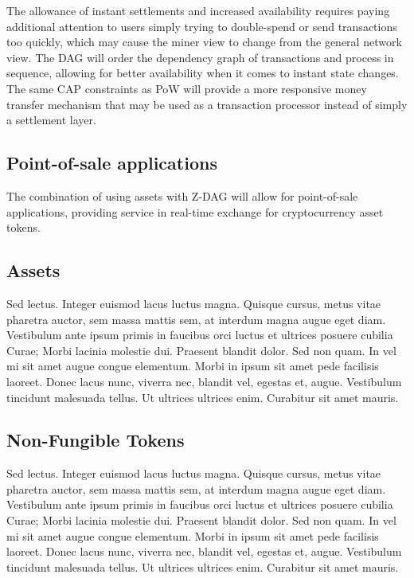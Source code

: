 \documentclass[peerreview]{ieeesyscoin}
\begin{document}
The allowance of instant settlements and increased availability requires paying additional attention to users simply trying to double-spend or send transactions too quickly, which may cause the miner view to change from the general network view. The DAG will order the dependency graph of transactions and process in sequence, allowing for better availability when it comes to instant state changes. The same CAP constraints as PoW will provide a more responsive money transfer mechanism that may be used as a transaction processor instead of simply a settlement layer.

\subsection{Point-of-sale applications}
The combination of using assets with Z-DAG will allow for point-of-sale applications, providing service in real-time exchange for cryptocurrency asset tokens.

\subsection{Assets}
Sed lectus. Integer euismod lacus luctus magna. Quisque cursus, metus vitae pharetra auctor, sem massa mattis sem, at interdum magna augue eget diam. Vestibulum ante ipsum primis in faucibus orci luctus et ultrices posuere cubilia Curae; Morbi lacinia molestie dui. Praesent blandit dolor. Sed non quam. In vel mi sit amet augue congue elementum. Morbi in ipsum sit amet pede facilisis laoreet. Donec lacus nunc, viverra nec, blandit vel, egestas et, augue. Vestibulum tincidunt malesuada tellus. Ut ultrices ultrices enim. Curabitur sit amet mauris. 

\subsection{Non-Fungible Tokens}

Sed lectus. Integer euismod lacus luctus magna. Quisque cursus, metus vitae pharetra auctor, sem massa mattis sem, at interdum magna augue eget diam. Vestibulum ante ipsum primis in faucibus orci luctus et ultrices posuere cubilia Curae; Morbi lacinia molestie dui. Praesent blandit dolor. Sed non quam. In vel mi sit amet augue congue elementum. Morbi in ipsum sit amet pede facilisis laoreet. Donec lacus nunc, viverra nec, blandit vel, egestas et, augue. Vestibulum tincidunt malesuada tellus. Ut ultrices ultrices enim. Curabitur sit amet mauris. 
\end{document}
